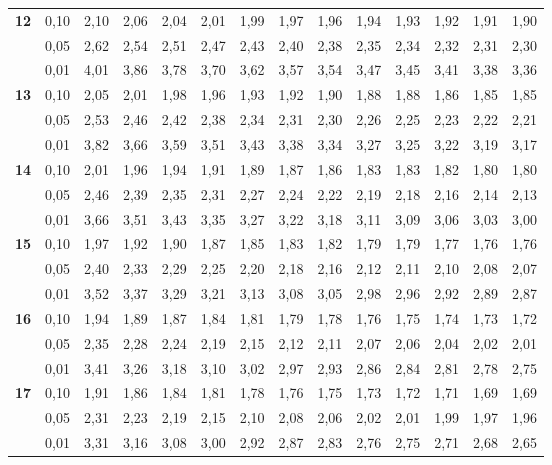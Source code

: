 \documentclass[12pt,a4paper]{article}
\begin{document}
{\begin{longtable}{@{\extracolsep{\fill}}rrrrrrrrrrrrrr@{}}
\addlinespace[1pt]
\textbf{12} & 0,10 & 2,10 & 2,06 & 2,04 & 2,01 & 1,99 & 1,97 & 1,96 & 1,94 & 1,93 & 1,92 & 1,91 & 1,90 \\*
 & 0,05 & 2,62 & 2,54 & 2,51 & 2,47 & 2,43 & 2,40 & 2,38 & 2,35 & 2,34 & 2,32 & 2,31 & 2,30 \\*
 & 0,01 & 4,01 & 3,86 & 3,78 & 3,70 & 3,62 & 3,57 & 3,54 & 3,47 & 3,45 & 3,41 & 3,38 & 3,36 \\
\addlinespace[1pt]
\textbf{13} & 0,10 & 2,05 & 2,01 & 1,98 & 1,96 & 1,93 & 1,92 & 1,90 & 1,88 & 1,88 & 1,86 & 1,85 & 1,85 \\*
 & 0,05 & 2,53 & 2,46 & 2,42 & 2,38 & 2,34 & 2,31 & 2,30 & 2,26 & 2,25 & 2,23 & 2,22 & 2,21 \\*
 & 0,01 & 3,82 & 3,66 & 3,59 & 3,51 & 3,43 & 3,38 & 3,34 & 3,27 & 3,25 & 3,22 & 3,19 & 3,17 \\
\addlinespace[1pt]
\textbf{14} & 0,10 & 2,01 & 1,96 & 1,94 & 1,91 & 1,89 & 1,87 & 1,86 & 1,83 & 1,83 & 1,82 & 1,80 & 1,80 \\*
 & 0,05 & 2,46 & 2,39 & 2,35 & 2,31 & 2,27 & 2,24 & 2,22 & 2,19 & 2,18 & 2,16 & 2,14 & 2,13 \\*
 & 0,01 & 3,66 & 3,51 & 3,43 & 3,35 & 3,27 & 3,22 & 3,18 & 3,11 & 3,09 & 3,06 & 3,03 & 3,00 \\
\addlinespace[1pt]
\textbf{15} & 0,10 & 1,97 & 1,92 & 1,90 & 1,87 & 1,85 & 1,83 & 1,82 & 1,79 & 1,79 & 1,77 & 1,76 & 1,76 \\*
 & 0,05 & 2,40 & 2,33 & 2,29 & 2,25 & 2,20 & 2,18 & 2,16 & 2,12 & 2,11 & 2,10 & 2,08 & 2,07 \\*
 & 0,01 & 3,52 & 3,37 & 3,29 & 3,21 & 3,13 & 3,08 & 3,05 & 2,98 & 2,96 & 2,92 & 2,89 & 2,87 \\
\addlinespace[1pt]
\textbf{16} & 0,10 & 1,94 & 1,89 & 1,87 & 1,84 & 1,81 & 1,79 & 1,78 & 1,76 & 1,75 & 1,74 & 1,73 & 1,72 \\*
 & 0,05 & 2,35 & 2,28 & 2,24 & 2,19 & 2,15 & 2,12 & 2,11 & 2,07 & 2,06 & 2,04 & 2,02 & 2,01 \\*
 & 0,01 & 3,41 & 3,26 & 3,18 & 3,10 & 3,02 & 2,97 & 2,93 & 2,86 & 2,84 & 2,81 & 2,78 & 2,75 \\
\addlinespace[1pt]
\textbf{17} & 0,10 & 1,91 & 1,86 & 1,84 & 1,81 & 1,78 & 1,76 & 1,75 & 1,73 & 1,72 & 1,71 & 1,69 & 1,69 \\*
 & 0,05 & 2,31 & 2,23 & 2,19 & 2,15 & 2,10 & 2,08 & 2,06 & 2,02 & 2,01 & 1,99 & 1,97 & 1,96 \\*
 & 0,01 & 3,31 & 3,16 & 3,08 & 3,00 & 2,92 & 2,87 & 2,83 & 2,76 & 2,75 & 2,71 & 2,68 & 2,65 \\

\end{longtable}}
\end{document}
